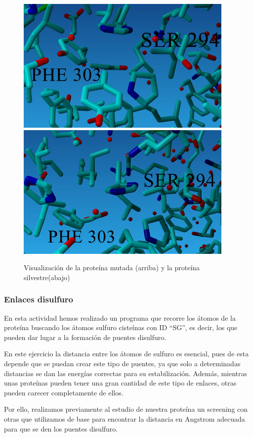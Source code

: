 \documentclass[12pt]{article}
\begin{document}
\begin{figure}[H]
\centering
\includegraphics[scale=0.9]{mut}
\includegraphics[scale=0.9]{nomut}
\caption{Visualización de la proteína mutada (arriba) y la proteína silvestre(abajo)}
\end{figure}
 

\subsubsection{Enlaces disulfuro}
En esta actividad hemos realizado un programa que recorre los átomos de la proteína buscando los átomos sulfuro cisteínas con ID ``SG'', es decir, los que pueden dar lugar a la formación de puentes disulfuro.
\newline

En este ejercicio la distancia entre los átomos de sulfuro es esencial, pues de esta depende que se puedan crear este tipo de puentes, ya que solo a determinadas distancias se dan las energías correctas para su estabilización. Además, mientras unas proteínas pueden tener una gran cantidad de este tipo de enlaces, otras pueden carecer completamente de ellos.
\newline

Por ello, realizamos previamente al estudio de nuestra proteína un screening con otras que utilizamos de base para encontrar la distancia en Angstrom adecuada para que se den los puentes disulfuro.
\newline
\end{document}
